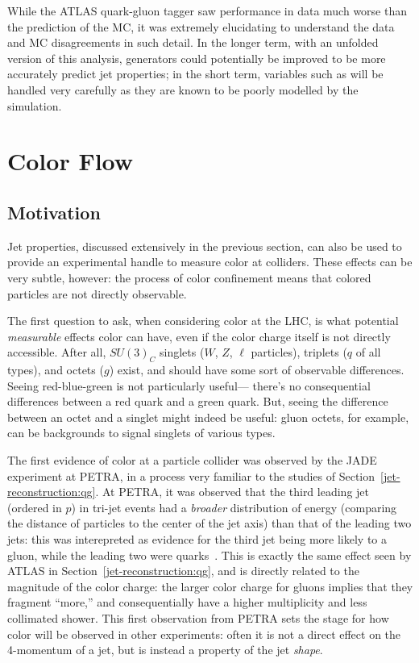 While the ATLAS quark-gluon tagger saw performance in data much worse than the prediction of the \Pythia MC, it was extremely elucidating to understand the data and MC disagreements in such detail. In the longer term, with an unfolded version of this analysis, generators could potentially be improved to be more accurately predict jet properties; in the short term, variables such as \ntrk will be handled very carefully as they are known to be poorly modelled by the simulation.

\FloatBarrier

\section{Color Flow}

\subsection{Motivation}

Jet properties, discussed extensively in the previous section, can also be used to provide an experimental handle to measure color at colliders. These effects can be very subtle, however: the process of color confinement means that colored particles are not directly observable.

The first question to ask, when considering color at the LHC, is what potential \textit{measurable} effects color can have, even if the color charge itself is not directly accessible. After all, $SU(3)_C$ singlets ($W$, $Z$, $\ell$ particles), triplets ($q$ of all types), and octets ($g$) exist, and should have some sort of observable differences. Seeing red-blue-green is not particularly useful--- there's no consequential differences between a red quark and a green quark. But, seeing the difference between an octet and a singlet might indeed be useful: gluon octets, for example, can be backgrounds to signal singlets of various types. 

The first evidence of color at a particle collider was observed by the JADE experiment at PETRA, in a process very familiar to the studies of Section~\ref{jet-reconstruction:qg}. At PETRA, it was observed that the third leading jet (ordered in $p$) in tri-jet events had a \textit{broader} distribution of energy (comparing the distance of particles to the center of the jet axis) than that of the leading two jets: this was interepreted as evidence for the third jet being more likely to a gluon, while the leading two were quarks~\cite{Bartel:1983ii}. This is exactly the same effect seen by ATLAS in Section~\ref{jet-reconstruction:qg}, and is directly related to the magnitude of the color charge: the larger color charge for gluons implies that they fragment ``more,'' and consequentially have a higher multiplicity and less collimated shower. This first observation from PETRA sets the stage for how color will be observed in other experiments: often it is not a direct effect on the 4-momentum of a jet, but is instead a property of the jet \textit{shape}. 

